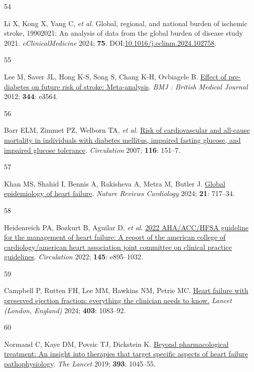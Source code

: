 \documentclass[
  letterpaper,
  headsepline=true,
  open=any]{scrbook}
\newlength{\cslhangindent}
\newlength{\csllabelwidth}
\newlength{\cslentryspacingunit} %
\newenvironment{CSLReferences}[2] %
 {%
  \setlength{\parindent}{0pt}
  \ifodd #1
  \let\oldpar\par
  \def\par{\hangindent=\cslhangindent\oldpar}
  \fi
  \setlength{\parskip}{#2\cslentryspacingunit}
 }%
 {}
\newcommand{\CSLLeftMargin}[1]{\parbox[t]{\csllabelwidth}{#1}}
\newcommand{\CSLRightInline}[1]{\parbox[t]{\linewidth - \csllabelwidth}{#1}\break}
\begin{document}
\begin{CSLReferences}{0}{0}
\leavevmode{}%
\CSLLeftMargin{54 }%
\CSLRightInline{Li X, Kong X, Yang C, \emph{et al.} Global, regional,
and national burden of ischemic stroke, 1990{\textendash}2021: An
analysis of data from the global burden of disease study 2021.
\emph{eClinicalMedicine} 2024; \textbf{75}.
DOI:\href{https://doi.org/10.1016/j.eclinm.2024.102758}{10.1016/j.eclinm.2024.102758}.}

\leavevmode{}%
\CSLLeftMargin{55 }%
\CSLRightInline{Lee M, Saver JL, Hong K-S, Song S, Chang K-H, Ovbiagele
B. \href{https://doi.org/10.1136/bmj.e3564}{Effect of pre-diabetes on
future risk of stroke: Meta-analysis}. \emph{BMJ : British Medical
Journal} 2012; \textbf{344}: e3564.}

\leavevmode{}%
\CSLLeftMargin{56 }%
\CSLRightInline{Barr ELM, Zimmet PZ, Welborn TA, \emph{et al.}
\href{https://doi.org/10.1161/CIRCULATIONAHA.106.685628}{Risk of
cardiovascular and all-cause mortality in individuals with diabetes
mellitus, impaired fasting glucose, and impaired glucose tolerance}.
\emph{Circulation} 2007; \textbf{116}: 151--7.}

\leavevmode{}%
\CSLLeftMargin{57 }%
\CSLRightInline{Khan MS, Shahid I, Bennis A, Rakisheva A, Metra M,
Butler J. \href{https://doi.org/10.1038/s41569-024-01046-6}{Global
epidemiology of heart failure}. \emph{Nature Reviews Cardiology} 2024;
\textbf{21}: 717--34.}

\leavevmode{}%
\CSLLeftMargin{58 }%
\CSLRightInline{Heidenreich PA, Bozkurt B, Aguilar D, \emph{et al.}
\href{https://doi.org/10.1161/CIR.0000000000001063}{2022 AHA/ACC/HFSA
guideline for the management of heart failure: A report of the american
college of cardiology/american heart association joint committee on
clinical practice guidelines}. \emph{Circulation} 2022; \textbf{145}:
e895--1032.}

\leavevmode{}%
\CSLLeftMargin{59 }%
\CSLRightInline{Campbell P, Rutten FH, Lee MM, Hawkins NM, Petrie MC.
\href{https://doi.org/10.1016/S0140-6736(23)02756-3}{Heart failure with
preserved ejection fraction: everything the clinician needs to know.}
\emph{Lancet (London, England)} 2024; \textbf{403}: 1083--92.}

\leavevmode{}%
\CSLLeftMargin{60 }%
\CSLRightInline{Normand C, Kaye DM, Povsic TJ, Dickstein K.
\href{https://doi.org/10.1016/S0140-6736(18)32216-5}{Beyond
pharmacological treatment: An insight into therapies that target
specific aspects of heart failure pathophysiology}. \emph{The Lancet}
2019; \textbf{393}: 1045--55.}


\end{CSLReferences}
\end{document}

